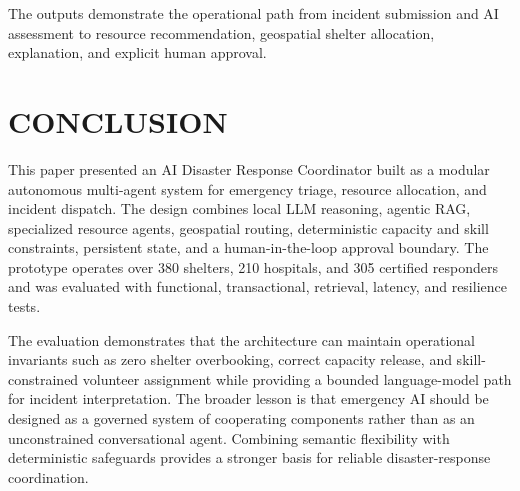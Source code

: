 \documentclass[conference]{IEEEtran}
\begin{document}
The outputs demonstrate the operational path from incident submission and AI assessment to resource recommendation, geospatial shelter allocation, explanation, and explicit human approval.

\section{CONCLUSION}
This paper presented an AI Disaster Response Coordinator built as a modular autonomous multi-agent system for emergency triage, resource allocation, and incident dispatch. The design combines local LLM reasoning, agentic RAG, specialized resource agents, geospatial routing, deterministic capacity and skill constraints, persistent state, and a human-in-the-loop approval boundary. The prototype operates over 380 shelters, 210 hospitals, and 305 certified responders and was evaluated with functional, transactional, retrieval, latency, and resilience tests.

The evaluation demonstrates that the architecture can maintain operational invariants such as zero shelter overbooking, correct capacity release, and skill-constrained volunteer assignment while providing a bounded language-model path for incident interpretation. The broader lesson is that emergency AI should be designed as a governed system of cooperating components rather than as an unconstrained conversational agent. Combining semantic flexibility with deterministic safeguards provides a stronger basis for reliable disaster-response coordination.
\end{document}

